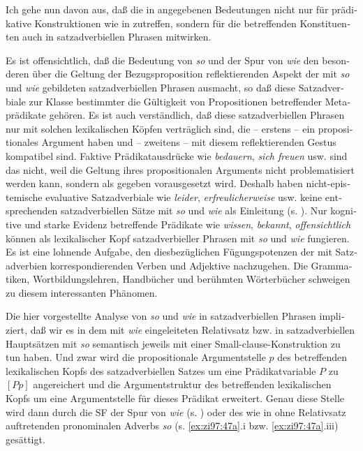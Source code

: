 \documentclass[output=paper, colorlinks, citecolor=brown, booklanguage=german]{langscibook}
\begin{document}
\begin{otherlanguage}{german}
Ich gehe nun davon aus, daß die in  angegebenen Bedeutungen nicht nur für prädikative Konstruktionen wie in  zutreffen, sondern für die betreffenden Konstituenten auch in satzadverbiellen Phrasen mitwirken.

Es ist offensichtlich, daß die Bedeutung von \textit{so} und der Spur von \textit{wie} den besonderen über die Geltung der Bezugsproposition reflektierenden Aspekt der mit \textit{so} und \textit{wie} gebildeten satzadverbiellen Phrasen ausmacht, so daß diese Satzadverbiale zur Klasse bestimmter die Gültigkeit von Propositionen betreffender Metaprädikate gehören. Es ist auch verständlich, daß diese satzadverbiellen Phrasen nur mit solchen lexikalischen Köpfen verträglich sind, die -- erstens -- ein propositionales Argument haben und -- zweitens -- mit diesem reflektierenden Gestus kompatibel sind. Faktive Prädikatausdrücke wie \textit{bedauern}, \textit{sich freuen} usw. sind das nicht, weil die Geltung ihres propositionalen Arguments nicht problematisiert werden kann, sondern als gegeben vorausgesetzt wird. Deshalb haben nicht-epistemische evaluative Satzadverbiale wie \textit{leider}, \textit{erfreulicherweise} usw. keine entsprechenden satzadverbiellen Sätze mit \textit{so} und \textit{wie} als Einleitung (s. \citealt{brandt1997derredesituierendewiesatz}%
). Nur kognitive und starke Evidenz betreffende Prädikate wie \textit{wissen}, \textit{bekannt}, \textit{offensichtlich} können als lexikalischer Kopf satzadverbieller Phrasen mit \textit{so} und \textit{wie} fungieren. Es ist eine lohnende Aufgabe, den diesbezüglichen Fügungspotenzen der mit Satzadverbien korrespondierenden Verben und Adjektive nachzugehen. Die Grammatiken, Wortbildungslehren, Handbücher und berühmten Wörterbücher schweigen zu diesem interessanten Phänomen.

Die hier vorgestellte Analyse von \textit{so} und \textit{wie} in satzadverbiellen Phrasen impliziert, daß wir es in dem mit \textit{wie} eingeleiteten Relativsatz bzw. in satzadverbiellen Hauptsätzen mit \textit{so} semantisch jeweils mit einer Small\hyp clause\hyp Konstruktion zu tun haben. Und zwar wird die propositionale Argumentstelle $p$ des betreffenden lexikalischen Kopfs des satzadverbiellen Satzes um eine Prädikatvariable $P$ zu $[ P p ]$ angereichert und die Argumentstruktur des betreffenden lexikalischen Kopfs um eine Argumentstelle für dieses Prädikat erweitert. Genau diese Stelle wird dann durch die SF der Spur von \textit{wie} (s. ) oder des wie in  ohne Relativsatz auftretenden pronominalen Adverbs \textit{so} (s. \ref{ex:zi97:47a}.i bzw. \ref{ex:zi97:47a}.iii) gesättigt.


\end{otherlanguage}
\end{document}
